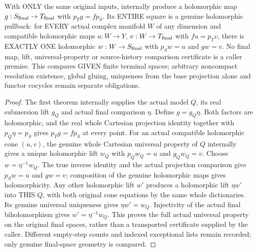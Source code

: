 \begin{theorem}
\label{hir:smooth-original-terminal-final-holomorphic-pullback}
\leanok
{}
With ONLY the same original inputs, internally produce a holomorphic map
$g:S_{\rm final}\to T_{\rm final}$ with $p_Tg=fp_S$. Its ENTIRE square is a
genuine holomorphic pullback: for EVERY actual complex manifold $W$ of any
dimension and compatible holomorphic maps $u:W\to Y$, $v:W\to T_{\rm final}$
with $fu=p_Tv$, there is EXACTLY ONE holomorphic $w:W\to S_{\rm final}$ with
$p_Sw=u$ and $gw=v$. No final map, lift, universal-property or source-history
comparison certificate is a caller premise. This compares GIVEN finite
terminal spaces; arbitrary noncompact resolution existence, global gluing,
uniqueness from the base projection alone and functor cocycles remain
separate obligations.
\end{theorem}
\begin{proof}
The first theorem internally supplies the actual model $Q$, its real
submersion lift $g_Q$ and actual final comparison $\eta$. Define
$g=g_Q\eta$. Both factors are holomorphic, and the real whole Cartesian
projection identity together with $p_Q\eta=p_S$ gives $p_Tg=fp_S$ at every
point. For an actual compatible holomorphic cone $(u,v)$, the genuine whole
Cartesian universal property of $Q$ internally gives a unique holomorphic
lift $w_Q$ with $p_Qw_Q=u$ and $g_Qw_Q=v$. Choose $w=\eta^{-1}w_Q$.
The true inverse identity and the actual projection comparison give
$p_Sw=u$ and $gw=v$; composition of the genuine holomorphic maps gives
holomorphicity. Any other holomorphic lift $w'$ produces a holomorphic
lift $\eta w'$ into THIS $Q$, with both original cone equations by the
same whole dictionaries. Its genuine universal uniqueness gives
$\eta w'=w_Q$. Injectivity of the actual final biholomorphism gives
$w'=\eta^{-1}w_Q$. This proves the full actual universal property on the
original final spaces, rather than a transported certificate supplied by
the caller. Different empty-step counts and indexed exceptional lists
remain recorded; only genuine final-space geometry is compared.
\end{proof}
